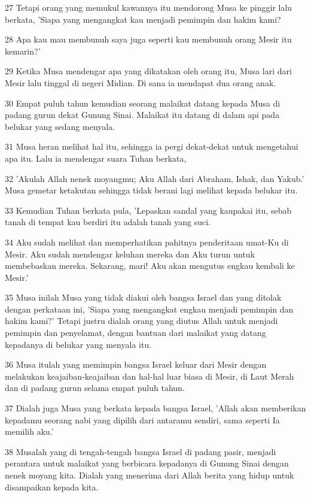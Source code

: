 \par 27 Tetapi orang yang memukul kawannya itu mendorong Musa ke pinggir lalu berkata, 'Siapa yang mengangkat kau menjadi pemimpin dan hakim kami?
\par 28 Apa kau mau membunuh saya juga seperti kau membunuh orang Mesir itu kemarin?'
\par 29 Ketika Musa mendengar apa yang dikatakan oleh orang itu, Musa lari dari Mesir lalu tinggal di negeri Midian. Di sana ia mendapat dua orang anak.
\par 30 Empat puluh tahun kemudian seorang malaikat datang kepada Musa di padang gurun dekat Gunung Sinai. Malaikat itu datang di dalam api pada belukar yang sedang menyala.
\par 31 Musa heran melihat hal itu, sehingga ia pergi dekat-dekat untuk mengetahui apa itu. Lalu ia mendengar suara Tuhan berkata,
\par 32 'Akulah Allah nenek moyangmu; Aku Allah dari Abraham, Ishak, dan Yakub.' Musa gemetar ketakutan sehingga tidak berani lagi melihat kepada belukar itu.
\par 33 Kemudian Tuhan berkata pula, 'Lepaskan sandal yang kaupakai itu, sebab tanah di tempat kau berdiri itu adalah tanah yang suci.
\par 34 Aku sudah melihat dan memperhatikan pahitnya penderitaan umat-Ku di Mesir. Aku sudah mendengar keluhan mereka dan Aku turun untuk membebaskan mereka. Sekarang, mari! Aku akan mengutus engkau kembali ke Mesir.'
\par 35 Musa inilah Musa yang tidak diakui oleh bangsa Israel dan yang ditolak dengan perkataan ini, 'Siapa yang mengangkat engkau menjadi pemimpin dan hakim kami?' Tetapi justru dialah orang yang diutus Allah untuk menjadi pemimpin dan penyelamat, dengan bantuan dari malaikat yang datang kepadanya di belukar yang menyala itu.
\par 36 Musa itulah yang memimpin bangsa Israel keluar dari Mesir dengan melakukan keajaiban-keajaiban dan hal-hal luar biasa di Mesir, di Laut Merah dan di padang gurun selama empat puluh tahun.
\par 37 Dialah juga Musa yang berkata kepada bangsa Israel, 'Allah akan memberikan kepadamu seorang nabi yang dipilih dari antaramu sendiri, sama seperti Ia memilih aku.'
\par 38 Musalah yang di tengah-tengah bangsa Israel di padang pasir, menjadi perantara untuk malaikat yang berbicara kepadanya di Gunung Sinai dengan nenek moyang kita. Dialah yang menerima dari Allah berita yang hidup untuk disampaikan kepada kita.

